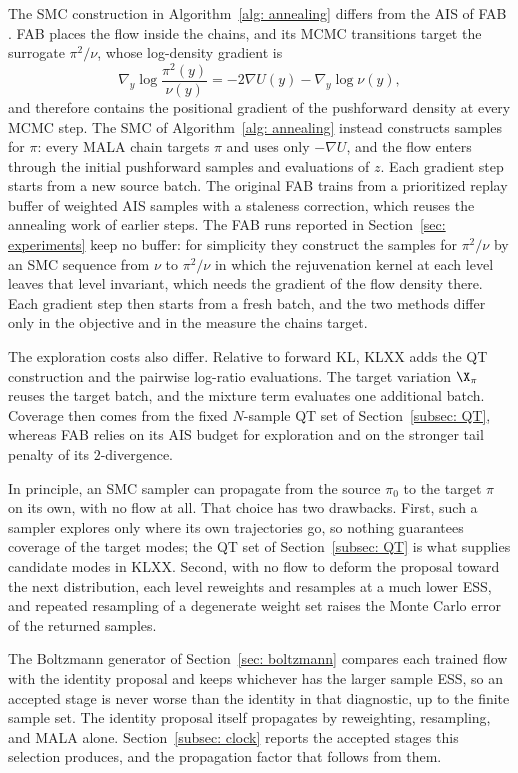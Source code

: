\documentclass{article}
\begin{document}
The SMC construction in Algorithm~\ref{alg: annealing} differs from the AIS of FAB \citep{midgley2022flow}. FAB places the flow inside the chains, and its MCMC transitions target the surrogate $\pi^2/\nu$, whose log-density gradient is
\begin{equation*}
	\nabla_y \log \frac{\pi^2(y)}{\nu(y)} = -2\nabla U(y) - \nabla_y \log\nu(y),
\end{equation*}
and therefore contains the positional gradient of the pushforward density at every MCMC step. The SMC of Algorithm~\ref{alg: annealing} instead constructs samples for $\pi$: every MALA chain targets $\pi$ and uses only $-\nabla U$, and the flow enters through the initial pushforward samples and evaluations of $z$. Each gradient step starts from a new source batch. The original FAB trains from a prioritized replay buffer of weighted AIS samples with a staleness correction, which reuses the annealing work of earlier steps. The FAB runs reported in Section~\ref{sec: experiments} keep no buffer: for simplicity they construct the samples for $\pi^2/\nu$ by an SMC sequence from $\nu$ to $\pi^2/\nu$ in which the rejuvenation kernel at each level leaves that level invariant, which needs the gradient of the flow density there. Each gradient step then starts from a fresh batch, and the two methods differ only in the objective and in the measure the chains target.

The exploration costs also differ. Relative to forward KL, KLXX adds the QT construction and the pairwise log-ratio evaluations. The target variation $\X_\pi$ reuses the target batch, and the mixture term evaluates one additional batch. Coverage then comes from the fixed $N$-sample QT set of Section~\ref{subsec: QT}, whereas FAB relies on its AIS budget for exploration and on the stronger tail penalty of its $2$-divergence.

\begin{remark}
	In principle, an SMC sampler can propagate from the source $\pi_0$ to the target $\pi$ on its own, with no flow at all. That choice has two drawbacks. First, such a sampler explores only where its own trajectories go, so nothing guarantees coverage of the target modes; the QT set of Section~\ref{subsec: QT} is what supplies candidate modes in KLXX. Second, with no flow to deform the proposal toward the next distribution, each level reweights and resamples at a much lower ESS, and repeated resampling of a degenerate weight set raises the Monte Carlo error of the returned samples.
	
	The Boltzmann generator of Section~\ref{sec: boltzmann} compares each trained flow with the identity proposal and keeps whichever has the larger sample ESS, so an accepted stage is never worse than the identity in that diagnostic, up to the finite sample set. The identity proposal itself propagates by reweighting, resampling, and MALA alone. Section~\ref{subsec: clock} reports the accepted stages this selection produces, and the propagation factor that follows from them.
\end{remark}
\end{document}
